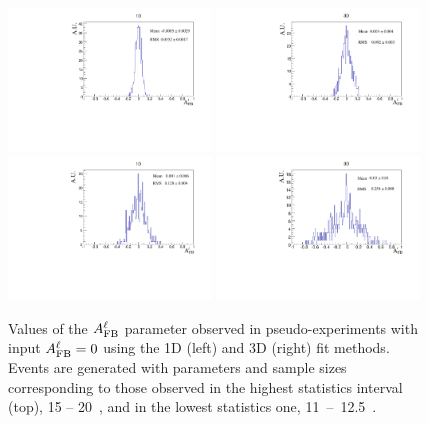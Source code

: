 \begin{figure}[h!]
\centering

\includegraphics[width=0.48\textwidth]{Lmumu/figs/toys3D/B1/1D/toys3D_afb.pdf}
\includegraphics[width=0.48\textwidth]{Lmumu/figs/toys3D/B1/3D/toys3D_afb.pdf}
\includegraphics[width=0.48\textwidth]{Lmumu/figs/toys3D/B2/1D/toys3D_afb.pdf}
\includegraphics[width=0.48\textwidth]{Lmumu/figs/toys3D/B2/3D/toys3D_afb.pdf}
\caption{Values of the $A_{\rm FB}^{\ell}$ parameter observed in pseudo-experiments 
with input $A_{\rm FB}^{\ell} = 0$ using the 1D (left) and 3D (right) fit methods. Events 
are generated with parameters and sample sizes corresponding to those observed in the highest 
statistics interval (top), 15 -- 20~\gevgevcccc, and in the lowest statistics one, \mbox{11 -- 12.5~\gevgevcccc}. }
\label{fig:3DtoyResults}
\end{figure}


